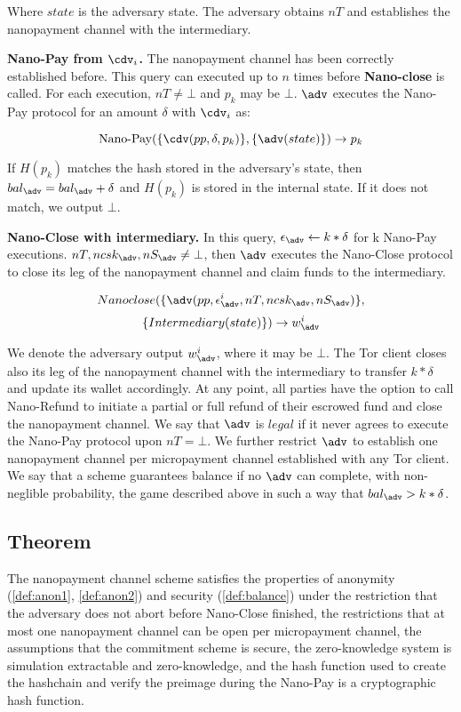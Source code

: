 Where $state$ is the adversary state. The adversary obtains $nT$ and establishes
the nanopayment channel with the intermediary.

\textbf{Nano-Pay from $\cdv_i$.} The nanopayment channel has been correctly
established before. This query can executed up to $n$ times before
\textbf{Nano-close} is called. For each execution, $nT \neq \bot$ and $p_k$ may
be $\bot$. $\adv$ executes the Nano-Pay protocol for an amount $\delta$ with
$\cdv_i$ as:

$$\operatorname{Nano-Pay}(\{\cdv(pp,\delta,p_k)\},\{\adv(state)\}) \rightarrow
p_k$$

If $H(p_k)$ matches the hash stored in the adversary's state, then $bal_\adv =
bal_\adv+\delta$ and $H(p_k)$ is stored in the internal state. If it does not
match, we output $\bot$.

\textbf{Nano-Close with intermediary.} In this query, $\epsilon_\adv \leftarrow
k*\delta$ for k Nano-Pay executions. $nT, ncsk_\adv, nS_\adv \neq \bot$, then
$\adv$ executes the Nano-Close protocol to close its leg of the nanopayment
channel and claim funds to the intermediary.

$$Nano\-close(\{\adv(pp, \epsilon^i_\adv, nT, ncsk_\adv, nS_\adv)\},$$
$$\{Intermediary(state)\}) \rightarrow w^i_\adv$$

We denote the adversary output $w^i_\adv$, where it may be $\bot$. The Tor
client closes also its leg of the nanopayment channel with the intermediary to
transfer $k*\delta$ and update its wallet accordingly. At any point, all parties
have the option to call Nano-Refund to initiate a partial or full refund of
their escrowed fund and close the nanopayment channel. We say that $\adv$ is
$legal$ if it never agrees to execute the Nano-Pay protocol upon $nT = \bot$. We
further restrict $\adv$ to establish one nanopayment channel per micropayment
channel established with any Tor client. We say that a scheme guarantees balance
if no $\adv$ can complete, with non-neglible probability, the game described
above in such a way that $bal_\adv > k*\delta$.

\subsection{Theorem}
The nanopayment channel scheme satisfies the properties of anonymity
(\ref{def:anon1}, \ref{def:anon2}) and security (\ref{def:balance}) under the
restriction that the adversary does not abort before Nano-Close finished, the
restrictions that at most one nanopayment channel can be open per micropayment
channel, the assumptions that the commitment scheme is secure, the
zero-knowledge system is simulation extractable and zero-knowledge, and the hash
function used to create the hashchain and verify the preimage during the
Nano-Pay is a cryptographic hash function.

